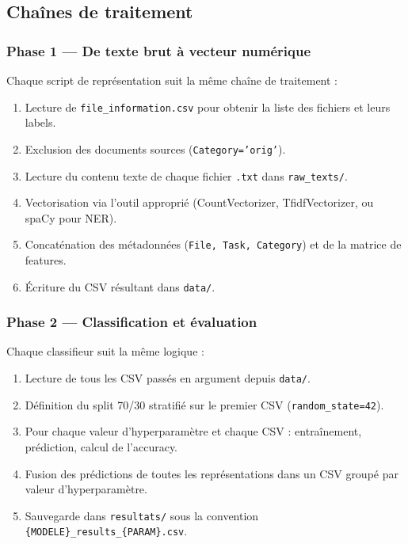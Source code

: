 \documentclass[12pt,a4paper]{article}
\begin{document}
\subsection{Chaînes de traitement}

\subsubsection{Phase 1 --- De texte brut à vecteur numérique}

Chaque script de représentation suit la même chaîne de traitement :

\begin{enumerate}
    \item Lecture de \texttt{file\_information.csv} pour obtenir la liste des fichiers et leurs labels.
    \item Exclusion des documents sources (\texttt{Category='orig'}).
    \item Lecture du contenu texte de chaque fichier \texttt{.txt} dans \texttt{raw\_texts/}.
    \item Vectorisation via l'outil approprié (CountVectorizer, TfidfVectorizer, ou spaCy pour NER).
    \item Concaténation des métadonnées (\texttt{File, Task, Category}) et de la matrice de features.
    \item Écriture du CSV résultant dans \texttt{data/}.
\end{enumerate}

\subsubsection{Phase 2 --- Classification et évaluation}

Chaque classifieur suit la même logique :

\begin{enumerate}
    \item Lecture de tous les CSV passés en argument depuis \texttt{data/}.
    \item Définition du split 70/30 stratifié sur le premier CSV (\texttt{random\_state=42}).
    \item Pour chaque valeur d'hyperparamètre et chaque CSV : entraînement, prédiction, calcul de l'accuracy.
    \item Fusion des prédictions de toutes les représentations dans un CSV groupé par valeur d'hyperparamètre.
    \item Sauvegarde dans \texttt{resultats/} sous la convention \texttt{\{MODELE\}\_results\_\{PARAM\}.csv}.
\end{enumerate}
\end{document}
